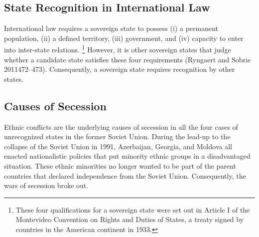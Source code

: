 \documentclass[12pt,a4paper]{article}%
\begin{document}
\subsection{State Recognition in International Law}\label{intl_law}
International law requires a sovereign state to possess (i) a permanent population, (ii) a defined territory, (iii) government, and (iv) capacity to enter into inter-state relations.%
\footnote{
	These four qualifications for a sovereign state were set out in Article I of the Montevideo Convention on Rights and Duties of States, a treaty signed by countries in the American continent in 1933.
	}
However, it is other sovereign states that judge whether a candidate state satisfies these four requirements (Ryngaert and Sobrie 2011472--473).
Consequently, a sovereign state requires recognition by other states.




 

  
\subsection{Causes of Secession}
Ethnic conflicts are the underlying causes of secession in all the four cases of unrecognized states in the former Soviet Union.
During the lead-up to the collapse of the Soviet Union in 1991, Azerbaijan, Georgia, and Moldova all enacted nationalistic policies that put minority ethnic groups in a disadvantaged situation. 
These ethnic minorities no longer wanted to be part of the parent countries that declared independence from the Soviet Union.
Consequently, the wars of secession broke out.
\end{document}
